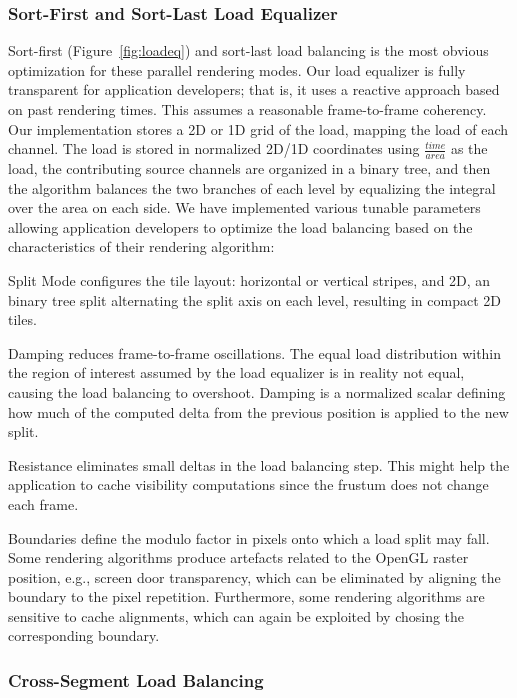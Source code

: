 \documentclass[10pt,journal,compsoc]{IEEEtran}
\newcommand{\fig}[1]{Figure~\ref{#1}}
\begin{document}
\subsubsection{Sort-First and Sort-Last Load Equalizer}

Sort-first (\fig{fig:loadeq}) and sort-last load balancing is the most obvious
optimization for these parallel rendering modes. Our load equalizer is fully
transparent for application developers; that is, it uses a reactive approach
based on past rendering times. This assumes a reasonable frame-to-frame
coherency. Our implementation stores a 2D or 1D grid of the load, mapping the
load of each channel. The load is stored in normalized 2D/1D coordinates using
$\frac{time}{area}$ as the load, the contributing source channels are organized
in a binary tree, and then the algorithm balances the two branches of each level
by equalizing the integral over the area on each side. We have implemented
various tunable parameters allowing application developers to optimize the load
balancing based on the characteristics of their rendering algorithm:

\begin{compactdesc}
\item[Split Mode] configures the tile layout: horizontal or vertical stripes,
and 2D, an binary tree split alternating the split axis on each level, resulting
in compact 2D tiles.
\item[Damping] reduces frame-to-frame oscillations. The equal load distribution
within the region of interest assumed by the load equalizer is in reality not
equal, causing the load balancing to overshoot. Damping is a normalized scalar
defining how much of the computed delta from the previous position is applied to
the new split.
\item[Resistance] eliminates small deltas in the load balancing step. This might
help the application to cache visibility computations since the frustum does not
change each frame.
\item[Boundaries] define the modulo factor in pixels onto which a load split may
fall. Some rendering algorithms produce artefacts related to the OpenGL raster
position, e.g., screen door transparency, which can be eliminated by aligning
the boundary to the pixel repetition. Furthermore, some rendering algorithms are
sensitive to cache alignments, which can again be exploited by chosing the
corresponding boundary.
\end{compactdesc}

\subsubsection{Cross-Segment Load Balancing}
\end{document}
